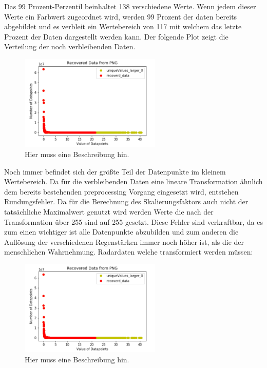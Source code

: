 Das 99 Prozent-Perzentil beinhaltet 138 verschiedene Werte. Wenn jedem dieser Werte ein Farbwert zugeordnet wird, werden 99 Prozent der daten bereits abgebildet und es verbleit ein Wertebereich von 117 mit welchem das letzte Prozent der Daten dargestellt werden kann.  
Der folgende Plot zeigt die Verteilung der noch verbleibenden Daten.

\begin{figure}[h]
 \centering
 \includegraphics[width=0.6\textwidth,angle=0]{abb/datenaufbereitung_beispiel}
 \caption[Datenaufbereitung]{Hier muss eine Beschreibung hin.}
\label{fig:datenaufbereitung}
\end{figure}

Noch immer befindet sich der größte Teil der Datenpunkte im kleinem Wertebereich. Da für die verbleibenden Daten eine lineare Transformation ähnlich dem bereits bestehenden preprocessing Vorgang eingesetzt wird, entstehen Rundungsfehler. Da für die Berechnung des Skalierungsfaktors auch nicht der tatsächliche Maximalwert genutzt wird werden Werte die nach der Transformation über 255 sind auf 255 gesetzt. Diese Fehler sind verkraftbar, da es zum einen wichtiger ist alle Datenpunkte abzubilden und zum anderen die Auflösung der verschiedenen Regenstärken immer noch höher ist, als die der menschlichen Wahrnehmung.  
Radardaten welche transformiert werden müssen:  

\begin{figure}[h]
 \centering
 \includegraphics[width=0.6\textwidth,angle=0]{abb/datenaufbereitung_beispiel}
 \caption[Datenaufbereitung]{Hier muss eine Beschreibung hin.}
\label{fig:datenaufbereitung}
\end{figure}

